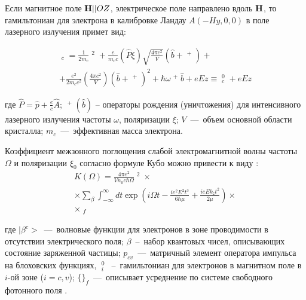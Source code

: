 {Если магнитное поле $\boldsymbol{\mathbf{H}}||OZ$, электрическое поле направлено вдоль $\boldsymbol{\mathbf{H}}$, то гамильтониан для электрона в калибровке Ландау $A(-Hy,0,0)$ в поле лазерного излучения примет вид:

\begin{multline} \label{eq:22_10} 
\mathop{\hat{H}}\nolimits_{c} =\frac{1}{2m_{c} } \mathop{\hat{P}}\nolimits^{2} +\frac{e}{m_{c} c} (\hat{P}\xi )\sqrt{\frac{4\pi c^{2} }{V} } (\hat{b}+\mathop{\hat{b}}\nolimits^{+} )+ \\ 
+\frac{e^{2} }{2m_{c} c^{2} } \left(\frac{4\pi c^{2} }{V} \right)(\hat{b}+\mathop{\hat{b}}\nolimits^{+} )^{2} +\hbar \omega \mathop{\hat{b}}\nolimits^{+} \hat{b}+eEz\equiv \mathop{\hat{H}}\nolimits_{c}^{0} +eEz
\end{multline}
 
где $\hat{P}=\hat{p}+\frac{e}{c} \hat{A}$; $\mathop{\hat{b}}\nolimits^{+} (\hat{b})$ -- операторы рождения (уничтожения) для интенсивного лазерного излучения частоты $\omega $, поляризации $\xi $; $V$~---~объем основной области кристалла; $m_{c} $~---~эффективная масса электрона.

Коэффициент межзонного поглощения слабой электромагнитной волны частоты $\Omega $ и поляризации $\xi _{0} $ согласно формуле Кубо \cite{Kubo1957a} можно привести к виду \cite{Sokovnich2004}:
\begin{multline} \label{eq:22_20} 
K(\Omega )=\frac{4\pi e^{2} }{Vn_{0} c\hbar \Omega } \mathop{\left|\frac{p_{cv} \xi _{0} }{m_{0} } \right|}\nolimits^{2} \times  \\
\times \sum _{\beta } \int _{-\infty }^{\infty}  dt \exp \left(i\Omega t-\frac{ie^{2} E^{2} t^{3} }{6\hbar \mu } +\frac{ieEk_{z} t^{2} }{2\mu } \right)\times  \\ 
\times \mathop{\left\{<\beta ^{c} |\exp \left(\frac{it}{\hbar } \mathop{\hat{H}}\nolimits_{v}^{0} \right)\exp \left(-\frac{it}{\hbar } \mathop{\hat{H}}\nolimits_{c}^{0} \right)|\beta ^{c} >\right\}}\nolimits_{f}  
\end{multline} 

где $|\beta ^{c} >$~---~волновые функции для электронов в зоне проводимости в отсутствии электрического поля; $\beta $~--~набор квантовых чисел, описывающих состояние заряженной частицы; $p_{cv} $~---~матричный элемент оператора импульса на блоховских функциях, $\mathop{\hat{H}}\nolimits_{i}^{0} $~--~гамильтониан для электронов в магнитном поле в $i$-ой зоне ($i=c,v$); $\{ \} _{f} $~---~описывает усреднение по системе свободного фотонного поля \cite{Glauber1963,Klauder1968}. 

}
